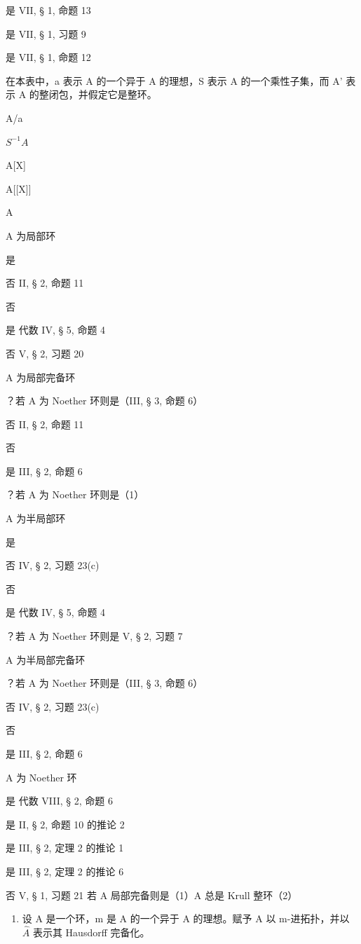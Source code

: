 是 VII, § 1, 命题 13

是 VII, § 1, 习题 9

是 VII, § 1, 命题 12


在本表中，a 表示 A 的一个异于 A 的理想，S 表示 A 的一个乘性子集，而 A' 表示 A 的整闭包，并假定它是整环。

A/a

\(S^{-1}A\)

A{[}X{]}

A{[}{[}X{]}{]}

A\textquotesingle{}

A 为局部环

是

否 II, § 2, 命题 11

否

是 代数 IV, § 5, 命题 4

否 V, § 2, 习题 20

A 为局部完备环

？若 A 为 Noether 环则是（III, § 3, 命题 6）

否 II, § 2, 命题 11

否

是 III, § 2, 命题 6

？若 A 为 Noether 环则是（1）

A 为半局部环

是

否 IV, § 2, 习题 23(c)

否

是 代数 IV, § 5, 命题 4

？若 A 为 Noether 环则是 V, § 2, 习题 7

A 为半局部完备环

？若 A 为 Noether 环则是（III, § 3, 命题 6）

否 IV, § 2, 习题 23(c)

否

是 III, § 2, 命题 6

A 为 Noether 环

是 代数 VIII, § 2, 命题 6

是 II, § 2, 命题 10 的推论 2

是 III, § 2, 定理 2 的推论 1

是 III, § 2, 定理 2 的推论 6

否 V, § 1, 习题 21 若 A 局部完备则是（1）A\textquotesingle{} 总是 Krull 整环（2）


\begin{enumerate}
\def\labelenumi{(\alph{enumi})}
\tightlist
\item
  设 A 是一个环，m 是 A 的一个异于 A 的理想。赋予 A 以 m-进拓扑，并以 \(\hat{A}\) 表示其 Hausdorff 完备化。
\end{enumerate}

